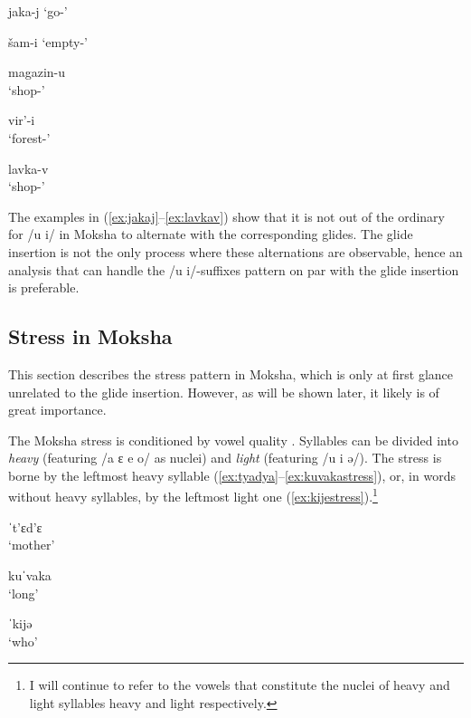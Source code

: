 \documentclass[a4paper, 12pt]{article}
\begin{document}
\begin{minipage}[t]{.3\linewidth}
\ex\label{ex:jakaj}
	jaka-j `go-{\Tsg}' 
\xe
\end{minipage}
\hfill
\begin{minipage}[t]{.3\linewidth}
\ex\label{ex:shami}
	šam-i `empty-{\Tsg}' 
\xe
\end{minipage}	
	
\begin{minipage}[t]{.3\linewidth}
\ex\label{ex:mag}
	magazin-u \\`shop-{\Lat}'
\xe
\end{minipage}
\hfill
\begin{minipage}[t]{.3\linewidth}
\ex\label{ex:viri}
	vir'-i \\`forest-{\Lat}'
\xe
\end{minipage}	
\hfill
\begin{minipage}[t]{.3\linewidth}
\ex\label{ex:lavkav}
	lavka-v \\`shop-{\Lat}'
\xe
\end{minipage}

	\noindent The examples in (\ref{ex:jakaj}--\ref{ex:lavkav}) show that it is not out of the ordinary for /u i/ in Moksha to alternate with the corresponding glides. The glide insertion is not the only process where these alternations are observable, hence an analysis that can handle the /u i/-suffixes pattern on par with the glide insertion is preferable.
			
			\subsection{Stress in Moksha}
		
	This section describes the stress pattern in Moksha, which is only at first glance unrelated to the glide insertion. However, as will be shown later, it likely is of great importance.
	
	The Moksha stress is conditioned by vowel quality \parencite{kukhto2018}. Syllables can be divided into \emph{heavy} (featuring /a ɛ e o/ as nuclei) and \emph{light} (featuring /u i ə/). The stress is borne by the leftmost heavy syllable (\ref{ex:tyadya}--\ref{ex:kuvakastress}), or, in words without heavy syllables, by the leftmost light one (\ref{ex:kijestress}).\footnote{I will continue to refer to the vowels that constitute the nuclei of heavy and light syllables heavy and light respectively.}
	
\begin{minipage}[t]{.25\linewidth}
\ex\label{ex:tyadya}
	ˈt'ɛd'ɛ \\`mother'
\xe
\end{minipage}
\hfill
\begin{minipage}[t]{.25\linewidth}
\ex\label{ex:kuvakastress}
	kuˈvaka \\`long'
\xe
\end{minipage}	
\hfill
\begin{minipage}[t]{.4\linewidth}
\ex\label{ex:kijestress}
	ˈkijə \\`who'
\xe
\end{minipage}
\end{document}
